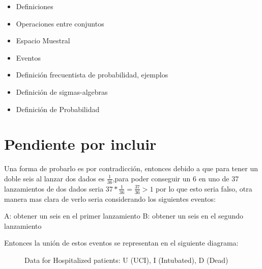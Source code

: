 \documentclass[12pt]{article}
\begin{document}
\begin{itemize}
\item Definiciones 

\item Operaciones entre conjuntos

\item Espacio Muestral

\item Eventos

\item Definición frecuentista de probabilidad, ejemplos

\item Definición de sigmas-algebras

\item Definición de Probabilidad

\end{itemize}







\section{Pendiente por incluir}

Una forma de probarlo es por contradicción, entonces debido a que para tener un doble seis al lanzar dos dados es $\frac{1}{36}$,para poder conseguir un 6 en uno de 37 lanzamientos de dos dados seria $37* \frac{1}{36} = \frac{37}{36} > 1$ por lo que esto seria falso, otra manera mas clara de verlo seria considerando los siguientes eventos: 

A: obtener un seis en el primer lanzamiento 
B: obtener un seis en el segundo lanzamiento 

Entonces la unión de estos eventos se representan  en el siguiente diagrama: 

\begin{figure}[!ht]
\centering
{}
\caption{Data for Hospitalized patients: U (UCI), I (Intubated), D (Dead)} \label{fig:Regiones}
\end{figure}
\end{document}
